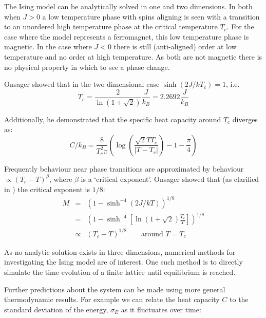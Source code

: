 \documentclass[12pt,a4paper,english]{article}
\begin{document}
The Ising model can be analytically solved in one and two dimensions.  In both when $J>0$ a low temperature phase with spins aligning is seen with a transition to an unordered high temperature phase at the critical temperature $T_c$.  For the case where the model represents a ferromagnet, this low temperature phase is magnetic.  In the case where $J<0$ there is still (anti-aligned) order at low temperature and no order at high temperature.  As both are not magnetic there is no physical property in which to see a phase change.

Onsager \cite{onsager44} showed that in the two dimensional case $\sinh \left(2J/kT_c\right)=1$, i.e.
\begin{equation}
\label{eq:T-c}
T_c= \frac{2} {\ln \left( 1 + \sqrt{2}\right)} \frac{J}{k_B} = 2.2692 \frac{J}{k_B}
\end{equation}

Additionally, he demonstrated that the specific heat capacity around $T_c$ diverges as:
\begin{equation}
\label{eq:heat-capacity}
C/k_B = \frac{8}{T_c^2 \pi} \left( \log \left( \frac{\sqrt{2}T T_c}{ |T-T_c| } \right) -1 - \frac{\pi}{4} \right)
\end{equation}

Frequently behaviour near phase transitions are approximated by behaviour $\propto \left( T_c - T\right)^\beta$, where $\beta$ is a `critical exponent'. Onsager showed that (as clarified in \cite{montroll63}) the critical exponent is $1/8$:
\begin{eqnarray}
M & = & \left( 1- \sinh^{-4} \left(2J/kT \right) \right)^{1/8} \\
  & = & \left( 1- \sinh^{-4} \left[\ln \left(1+\sqrt{2}\right) \frac{T_c}{T} \right] \right)^{1/8} \\
  & \propto & \left( T_c - T \right)^{1/8} \qquad \textrm{around } T=T_c
\label{eq:critical-exponent}
\end{eqnarray}

As no analytic solution exists in three dimensions, numerical methods for investigating the Ising model are of interest.  One such method is to directly simulate the time evolution of a finite lattice until equilibrium is reached.

\medskip

Further predictions about the system can be made using more general thermodynamic results.  For example we can relate the heat capacity $C$ to the standard deviation of the energy, $\sigma_E$ as it fluctuates over time\cite{rosser82-e-fluc}:
\end{document}
